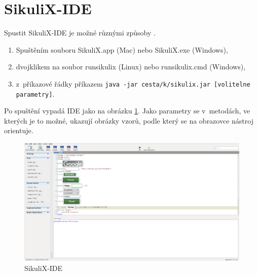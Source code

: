 \documentclass{bakalarka}
\begin{document}
	\section{SikuliX-IDE}
	Spustit SikuliX-IDE je možné různými způsoby \cite{SikuliX}.
	\begin{enumerate}[leftmargin=*, topsep=-3.5mm, itemsep=-1.5mm]
		\item Spuštěním souboru SikuliX.app (Mac) nebo SikuliX.exe (Windows),
		\item dvojklikem na soubor runsikulix (Linux) nebo runsikulix.cmd (Windows),
		\item z~příkazové řádky příkazem \texttt{java -jar cesta/k/sikulix.jar [volitelne parametry]}.
	\end{enumerate}
	Po spuštění vypadá IDE jako na obrázku \ref{SikuliXIDE}. Jako parametry se v~metodách, ve kterých je to možné, ukazují obrázky vzorů, podle který se na obrazovce nástroj orientuje.
	\begin{figure}[ht]
		\caption{SikuliX-IDE}
		\label{SikuliXIDE}
		\includegraphics[width=14cm]{img/IDE/SikuliXIDE.png}
	\end{figure}
	
\end{document}
